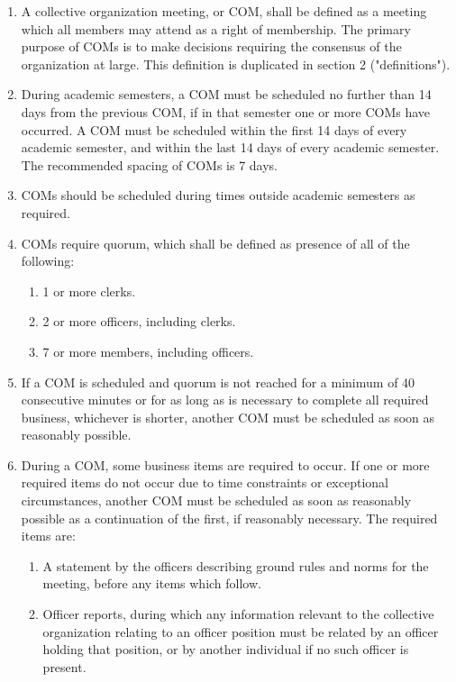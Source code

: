 \documentclass[11pt]{article}
\newcounter{h1}
\newcounter{h2}[h1]
\newcounter{h3}[h2]
\begin{document}

\begin{enumerate}
  \item A collective organization meeting, or COM, shall be defined as a meeting which all members may attend as a right of membership. The primary purpose of COMs is to make decisions requiring the consensus of the organization at large. This definition is duplicated in section 2 ("definitions").  
  \item During academic semesters, a COM must be scheduled no further than 14 days from the previous COM, if in that semester one or more COMs have occurred. A COM must be scheduled within the first 14 days of every academic semester, and within the last 14 days of every academic semester. The recommended spacing of COMs is 7 days.  
  \item COMs should be scheduled during times outside academic semesters as required.  
  \item COMs require quorum, which shall be defined as presence of all of the following:  
  \begin{enumerate}
    \item 1 or more clerks.  
    \item 2 or more officers, including clerks.  
    \item 7 or more members, including officers.  
  \end{enumerate}
  \item If a COM is scheduled and quorum is not reached for a minimum of 40 consecutive minutes or for as long as is necessary to complete all required business, whichever is shorter, another COM must be scheduled as soon as reasonably possible.  
  \item During a COM, some business items are required to occur. If one or more required items do not occur due to time constraints or exceptional circumstances, another COM must be scheduled as soon as reasonably possible as a continuation of the first, if reasonably necessary. The required items are:  
  \begin{enumerate}
    \item A statement by the officers describing ground rules and norms for the meeting, before any items which follow.  
    \item Officer reports, during which any information relevant to the collective organization relating to an officer position must be related by an officer holding that position, or by another individual if no such officer is present.  

\end{enumerate}
\end{enumerate}
\end{document}

